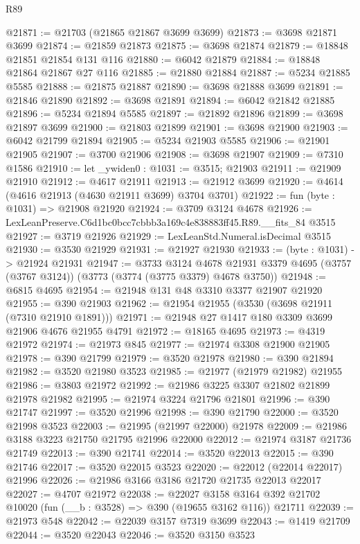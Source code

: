 \begin{lexlean}{R89}
\begin{coremodule}
@21871 := @21703 (@21865 @21867 @3699 @3699)
@21873 := @3698 @21871 @3699
@21874 := @21859 @21873
@21875 := @3698 @21874
@21879 := @18848 @21851 @21854 @131 @116
@21880 := @6042 @21879
@21884 := @18848 @21864 @21867 @27 @116
@21885 := @21880 @21884
@21887 := @5234 @21885 @5585
@21888 := @21875 @21887
@21890 := @3698 @21888 @3699
@21891 := @21846 @21890
@21892 := @3698 @21891
@21894 := @6042 @21842 @21885
@21896 := @5234 @21894 @5585
@21897 := @21892 @21896
@21899 := @3698 @21897 @3699
@21900 := @21803 @21899
@21901 := @3698 @21900
@21903 := @6042 @21799 @21894
@21905 := @5234 @21903 @5585
@21906 := @21901 @21905
@21907 := @3700 @21906
@21908 := @3698 @21907
@21909 := @7310 @1586
@21910 := let _ywiden0 : @1031 := @3515; @21903
@21911 := @21909 @21910
@21912 := @4617 @21911
@21913 := @21912 @3699
@21920 := @4614 (@4616 @21913 (@4630 @21911 @3699) @3704 @3701)
@21922 := fun (byte : @1031) => @21908 @21920
@21924 := @3709 @3124 @4678
@21926 := LexLeanPreserve.C6d1bc0bcc7cbbb3a169c4e838883ff45.R89.__fits_84 @3515
@21927 := @3719 @21926
@21929 := LexLeanStd.Numeral.isDecimal @3515
@21930 := @3530 @21929
@21931 := @21927 @21930
@21933 := (byte : @1031) -> @21924 @21931
@21947 := @3733
    @3124
    @4678
    @21931
    @3379
    @4695
    (@3757 (@3767 @3124))
    (@3773 (@3774 (@3775 @3379) @4678 @3750))
@21948 := @6815 @4695
@21954 := @21948 @131 @48 @3310 @3377 @21907 @21920
@21955 := @390 @21903
@21962 := @21954 @21955 (@3530 (@3698 @21911 (@7310 @21910 @1891)))
@21971 := @21948 @27 @1417 @180 @3309 @3699 @21906 @4676 @21955 @4791
@21972 := @18165 @4695
@21973 := @4319 @21972
@21974 := @21973 @845
@21977 := @21974 @3308 @21900 @21905
@21978 := @390 @21799
@21979 := @3520 @21978
@21980 := @390 @21894
@21982 := @3520 @21980 @3523
@21985 := @21977 (@21979 @21982) @21955
@21986 := @3803 @21972
@21992 := @21986 @3225 @3307 @21802 @21899 @21978 @21982
@21995 := @21974 @3224 @21796 @21801
@21996 := @390 @21747
@21997 := @3520 @21996
@21998 := @390 @21790
@22000 := @3520 @21998 @3523
@22003 := @21995 (@21997 @22000) @21978
@22009 := @21986 @3188 @3223 @21750 @21795 @21996 @22000
@22012 := @21974 @3187 @21736 @21749
@22013 := @390 @21741
@22014 := @3520 @22013
@22015 := @390 @21746
@22017 := @3520 @22015 @3523
@22020 := @22012 (@22014 @22017) @21996
@22026 := @21986 @3166 @3186 @21720 @21735 @22013 @22017
@22027 := @4707 @21972
@22038 := @22027
    @3158
    @3164
    @392
    @21702
    @10020
    (fun (__b : @3528) => @390 (@19655 @3162 @116))
    @21711
@22039 := @21973 @548
@22042 := @22039 @3157 @7319 @3699
@22043 := @1419 @21709
@22044 := @3520 @22043
@22046 := @3520 @3150 @3523

\end{coremodule}
\end{lexlean}
